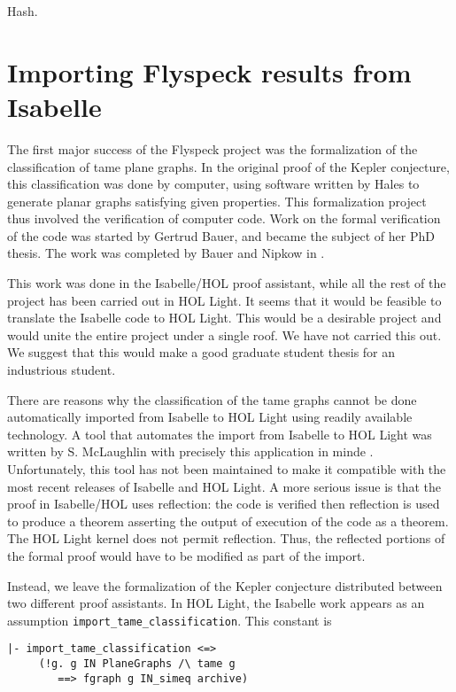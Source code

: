 Hash.


\section{Importing Flyspeck results from Isabelle}

The first major success of the Flyspeck project was the formalization of the classification of tame plane graphs.
In the original proof of the Kepler conjecture, this classification was done by computer, using software written by Hales
to generate planar graphs satisfying given properties.   This formalization project
thus involved the verification of computer code.  Work on the formal verification of the code was started by Gertrud Bauer,
and became the subject of her PhD thesis.  The work was completed by Bauer and Nipkow in \cite{XX}.

This work was done in the Isabelle/HOL proof assistant, while all the rest of the project has been carried out in HOL Light.
It seems that it would be feasible to translate the Isabelle code to HOL Light.  This would be a desirable project and would
unite the entire project under a single roof.  We have not carried this out.   We suggest that this would make a good graduate
student thesis for an industrious student.

There are reasons why the classification of the tame graphs cannot be done automatically imported from Isabelle to HOL Light
using readily available technology.   A tool that automates the import from Isabelle to HOL Light was written by
S. McLaughlin with precisely this application in minde \cite{XX}.  Unfortunately, this tool has not been maintained to make it
compatible with the most recent releases of Isabelle and HOL Light.   A more serious issue is that the proof in Isabelle/HOL uses
reflection:  the code is verified then reflection is used to produce a theorem asserting the output of execution of the code as
a theorem.   The HOL Light kernel does not permit reflection.  Thus, the reflected portions of the formal proof would have to be
modified as part of the import.

Instead, we leave the formalization of the Kepler conjecture distributed between two different proof assistants.
In HOL Light, the Isabelle work appears as an assumption
\verb!import_tame_classification!.  This constant is 


\begin{obeylines}

\begin{verbatim}
|- import_tame_classification <=>
     (!g. g IN PlaneGraphs /\ tame g 
        ==> fgraph g IN_simeq archive)
\end{verbatim}

\end{obeylines}

